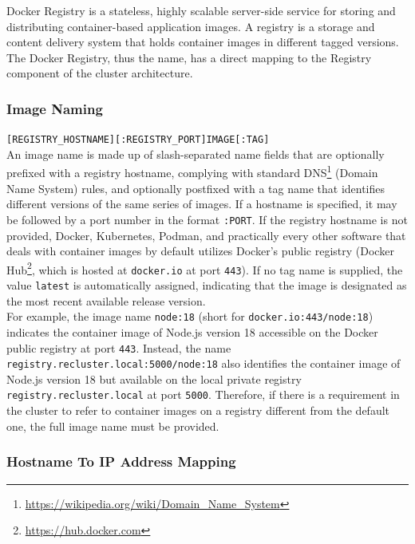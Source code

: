 Docker Registry is a stateless, highly scalable server-side service for storing
and distributing container-based application images\cite{docker_registry}. A
registry is a storage and content delivery system that holds container images in
different tagged versions\cite{docker_registry_about}. \\ %
The Docker Registry, thus the name, has a direct mapping to the Registry component
of the cluster architecture.

\subsubsection{Image Naming}
\label{subsubsec:implementation_dependencies_docker_registry_image_naming}

\texttt{[REGISTRY\_HOSTNAME][:REGISTRY\_PORT]IMAGE[:TAG]} \\ %
An image name is made up of slash-separated name fields that are optionally prefixed
with a registry hostname, complying with standard DNS\footnote{\url{https://wikipedia.org/wiki/Domain_Name_System}}
(Domain Name System) rules, and optionally postfixed with a tag name that identifies
different versions of the same series of images. If a hostname is specified, it may
be followed by a port number in the format \texttt{:PORT}. If the registry
hostname is not provided, Docker, Kubernetes, Podman, and practically every
other software that deals with container images by default utilizes Docker's
public registry (Docker Hub\footnote{\url{https://hub.docker.com}}, which is
hosted at \texttt{docker.io} at port \texttt{443})\cite{k8s_image_names}. If no tag
name is supplied, the value \texttt{latest} is automatically assigned,
indicating that the image is designated as the most recent available release
version\cite{docker_tag}. \\ %
For example, the image name \texttt{node:18} (short for \texttt{docker.io:443/node:18})
indicates the container image of Node.js version 18 accessible on the Docker
public registry at port \texttt{443}. Instead, the name \texttt{registry.recluster.local:5000/node:18}
also identifies the container image of Node.js version 18 but available on the
local private registry \texttt{registry.recluster.local} at port \texttt{5000}. Therefore,
if there is a requirement in the cluster to refer to container images on a
registry different from the default one, the full image name must be provided.

\subsubsection{Hostname To IP Address Mapping}
\label{subsubsec:implementation_dependencies_docker_registry_hostname_to_ip_address_mapping}

